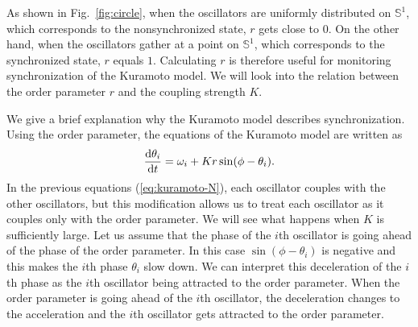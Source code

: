 As shown in Fig.~\ref{fig:circle},
when the oscillators are uniformly distributed on $\mathbb{S}^{1}$,
which corresponds to the nonsynchronized state,
$r$ gets close to $0$.
On the other hand,
when the oscillators gather at a point on $\mathbb{S}^{1}$,
which corresponds to the synchronized state, $r$ equals $1$.
Calculating $r$ is therefore useful for monitoring synchronization of the Kuramoto model.
We will look into the relation between the order parameter $r$
and the coupling strength $K$.

We give a brief explanation why the Kuramoto model describes synchronization.
Using the order parameter,
the equations of the Kuramoto model are written as
\begin{align}
  \frac{\mathrm{d}\theta_{i}}{\mathrm{d} t}=\omega_{i}+Kr\sin(\phi-\theta_{i}).
  \label{eq:kuramoto-orderparameter}
\end{align}
In the previous equations (\ref{eq:kuramoto-N}),
each oscillator couples with the other oscillators,
but this modification allows us to treat each oscillator
as it couples only with the order parameter.
We will see what happens when $K$ is sufficiently large.
Let us assume that the phase of the $i$th oscillator is going ahead of the phase of the order parameter.
In this case $\sin(\phi-\theta_{i})$ is negative and this makes the $i$th phase $\theta_{i}$ slow down.
We can interpret this deceleration of the $i$th phase as the $i$th oscillator being attracted to the order parameter.
When the order parameter is going ahead of the $i$th oscillator,
the deceleration changes to the acceleration and the $i$th oscillator gets attracted to the order parameter.


